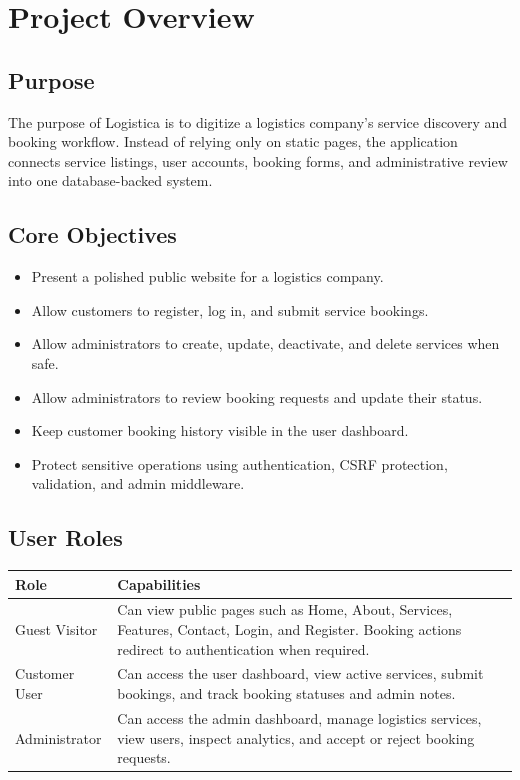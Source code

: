 \documentclass[12pt,a4paper]{report}
\newcommand{\project}{Logistica}
\begin{document}
\chapter{Project Overview}

\section{Purpose}

The purpose of \project{} is to digitize a logistics company's service discovery and booking workflow. Instead of relying only on static pages, the application connects service listings, user accounts, booking forms, and administrative review into one database-backed system.

\section{Core Objectives}

\begin{itemize}
    \item Present a polished public website for a logistics company.
    \item Allow customers to register, log in, and submit service bookings.
    \item Allow administrators to create, update, deactivate, and delete services when safe.
    \item Allow administrators to review booking requests and update their status.
    \item Keep customer booking history visible in the user dashboard.
    \item Protect sensitive operations using authentication, CSRF protection, validation, and admin middleware.
\end{itemize}

\section{User Roles}

\begin{longtable}{L{0.22\textwidth} L{0.68\textwidth}}
\toprule
\textbf{Role} & \textbf{Capabilities} \\
\midrule
Guest Visitor & Can view public pages such as Home, About, Services, Features, Contact, Login, and Register. Booking actions redirect to authentication when required. \\
Customer User & Can access the user dashboard, view active services, submit bookings, and track booking statuses and admin notes. \\
Administrator & Can access the admin dashboard, manage logistics services, view users, inspect analytics, and accept or reject booking requests. \\
\bottomrule
\end{longtable}
\end{document}
